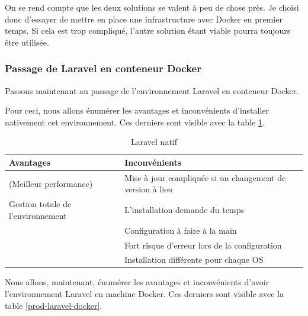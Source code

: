 \documentclass[
    iai, %
    il, %
]{heig-tb}
\begin{document}
On se rend compte que les deux solutions se valent à peu de chose près. Je choisi donc d'essayer de mettre en place une infrastructure avec Docker en premier temps. Si cela est trop compliqué, l'autre solution étant viable pourra toujours être utilisée.

\subsubsection{Passage de Laravel en conteneur Docker}
Passons maintenant au passage de l'environnement Laravel en conteneur Docker.

Pour ceci, nous allons énumérer les avantages et inconvénients d'installer nativement cet
environnement. Ces derniers sont visible avec la table \ref{prod-laravel-native}.

\begin{table}[h]
    \begin{center}
        \caption{Laravel natif \label{prod-laravel-native}}
        \begin{tabularx}{1.0\textwidth} {X|X}
            Avantages                         & Inconvénients                                             \\ \hline
            (Meilleur performance)            & Mise à jour compliquée si un changement de version à lieu \\
            Gestion totale de l'environnement & L'installation demande du temps                           \\
                                              & Configuration à faire à la main                           \\
                                              & Fort risque d'erreur lors de la configuration             \\
                                              & Installation différente pour chaque OS                    \\
        \end{tabularx}
    \end{center}
\end{table}

Nous allons, maintenant, énumérer les avantages et inconvénients d'avoir l'environnement Laravel
en machine Docker. Ces derniers sont visible avec la table \ref{prod-laravel-docker}.
\end{document}
